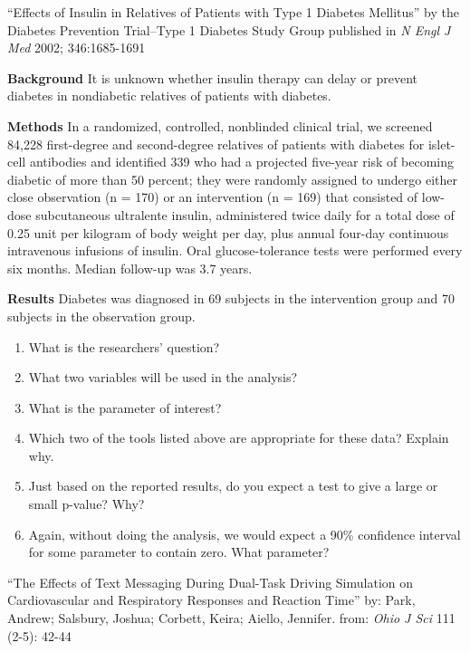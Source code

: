 \begin{alist}
\item ``Effects of Insulin in Relatives of Patients with Type 1
  Diabetes Mellitus'' by the Diabetes Prevention Trial–Type 1 Diabetes
  Study Group published in {\it N Engl J Med} 2002; 346:1685-1691

  \begin{list}{}{}
  \item [\bf Background]
    It is unknown whether insulin therapy can delay or prevent
    diabetes in nondiabetic relatives of patients with diabetes. 
  \item [\bf Methods]
    In a randomized, controlled, nonblinded clinical trial, we
    screened 84,228 first-degree and second-degree relatives of
    patients with diabetes for islet-cell antibodies and identified
    339 who had a projected five-year risk of becoming diabetic of
    more than 50 percent; they were randomly assigned to undergo
    either close observation (n = 170) or an intervention (n = 169)
    that consisted of low-dose subcutaneous ultralente insulin,
    administered twice daily for a total dose of 0.25 unit per
    kilogram of body weight per day, plus annual four-day continuous
    intravenous infusions of insulin. Oral glucose-tolerance tests
    were performed every six months. Median follow-up was 3.7 years.
  \item [\bf Results]
    Diabetes was diagnosed in 69 subjects in the intervention group
    and 70 subjects in the observation group. 
  \end{list}
  \begin{enumerate}
   \item What is the researchers' question?\vspace{1cm}
   \item What two variables will be used in the analysis?\vspace{1cm}
   \item What is the parameter of interest?\vspace{1cm}
   \item Which two of the tools listed above are appropriate for these
     data? Explain why.\vspace{2cm}
   \item Just based on the reported results, do you expect a test to
     give a large or small p-value?  Why?\vspace{1cm}
   \item Again, without doing the analysis, we would expect a 90\%
     confidence interval for some parameter to contain zero.  What
     parameter? \vspace{1cm}
  \end{enumerate}
\item ``The Effects of Text Messaging During Dual-Task Driving Simulation on Cardiovascular and Respiratory Responses and Reaction Time''
  by:  	Park, Andrew; Salsbury, Joshua; Corbett, Keira; Aiello,
  Jennifer. 
  from: {\it Ohio J Sci} 111 (2-5): 42-44 


\end{alist}
